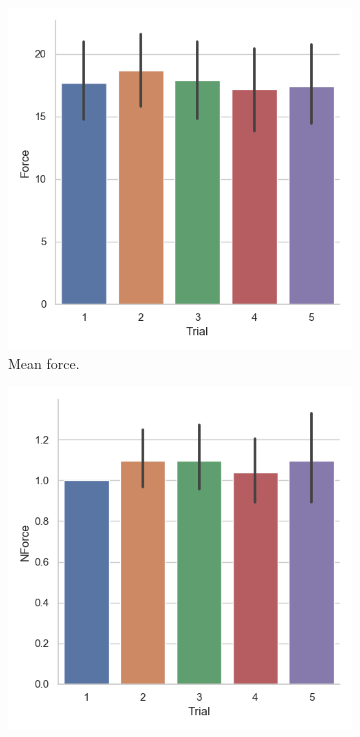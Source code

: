 \begin{figure}[H]
\hspace{-10mm}
     \begin{subfigure}[b]{0.3\textwidth}
         \centering         \includegraphics[scale=0.4]{Files/Plots/force_mean_by_trial.png}
         \caption{Mean force.}
     \label{fig:forceMeanTrial}
     \end{subfigure}
     \hspace{7mm}
     \begin{subfigure}[b]{0.3\textwidth}
         \centering
     \includegraphics[scale=0.4]{Files/Plots/forceNforce_mean_by_trial.png}

\end{subfigure}
\end{figure}
